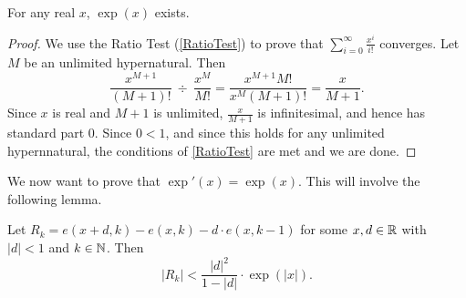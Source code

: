\begin{thm}\label{expExists}
    For any real $x$, $\exp(x)$ exists.
\end{thm}

\begin{proof}
    We use the Ratio Test (\autoref{RatioTest}) to prove that $\sum_{i=0}^\infty \frac{x^i}{i!}$ converges. Let $M$ be an unlimited hypernatural. Then 
    \[
        \frac{x^{M+1}}{(M+1)!} \  \div \  \frac{x^M}{M!} = \frac{x^{M+1}M!}{x^M (M+1)!} 
        = \frac{x}{M+1}.
    \]
    Since $x$ is real and $M+1$ is unlimited, $\frac{x}{M+1}$ is infinitesimal, and hence has standard part $0$. Since $0 < 1$, and since this holds for any unlimited hypernnatural, the conditions of \autoref{RatioTest} are met and we are done.
\end{proof}

We now want to prove that $\exp'(x) = \exp(x)$. This will involve the following lemma.

\begin{lemma}\label{expRemainderLemma}
    Let $R_k = e(x+d, k) - e(x, k) - d \cdot e(x, k-1)$ for some $x, d \in \mathbb{R}$ with $|d| < 1$ and $k \in \mathbb{N}$. Then
    \[ |R_k| < \frac{|d|^2}{1-|d|} \cdot \exp(|x|). \]
\end{lemma}

